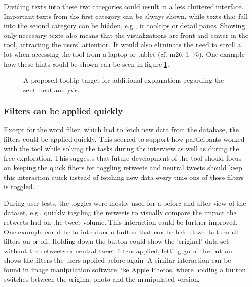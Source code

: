 Dividing texts into these two categories could result in a less cluttered interface. Important texts from the first category can be always shown, while texts that fall into the second category can be hidden, e.g., in tooltips or detail panes. Showing only necessary texts also means that the visualizations are front-and-center in the tool, attracting the users' attention. It would also eliminate the need to scroll a lot when accessing the tool from a laptop or tablet (cf. m26, l. 75). One example how these hints could be shown can be seen in figure \ref{fig:sentiment_tooltip_hint}.

\begin{figure}[htb]
    \centering
    \caption{A proposed tooltip target for additional explanations regarding the sentiment analysis.}
    \label{fig:sentiment_tooltip_hint}
\end{figure}

\subsubsection*{Filters can be applied quickly}
Except for the word filter, which had to fetch new data from the database, the filters could be applied quickly. This seemed to support how participants worked with the tool while solving the tasks during the interview as well as during the free exploration. This suggests that future development of the tool should focus on keeping the quick filters for toggling retweets and neutral tweets should keep this interaction quick instead of fetching new data every time one of these filters is toggled.

During user tests, the toggles were mostly used for a before-and-after view of the dataset, e.g., quickly toggling the retweets to visually compare the impact the retweets had on the tweet volume. This interaction could be further improved. One example could be to introduce a button that can be held down to turn all filters on or off. Holding down the button could show the 'original' data set without the retweet- or neutral tweet filters applied, letting go of the button shows the filters the users applied before again. A similar interaction can be found in image manipulation software like Apple Photos, where holding a button switches between the original photo and the manipulated version.
